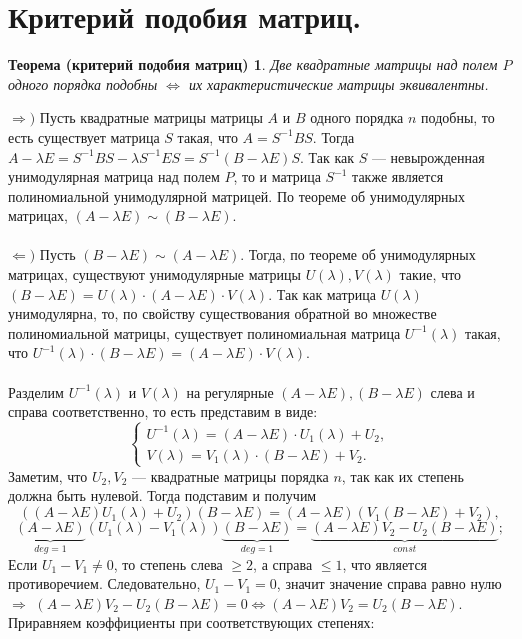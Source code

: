 \section{Критерий подобия матриц.}
\newtheorem*{th12_6}{Теорема (критерий подобия матриц)}\begin{th12_6}Две квадратные матрицы над полем $P$ одного порядка подобны
	$\Longleftrightarrow$ их характеристические матрицы эквивалентны.
\end{th12_6}\begin{Proof}
	$\Rightarrow)$ Пусть квадратные матрицы матрицы $A$ и $B$ одного порядка $n$ подобны, то есть существует матрица $S$ такая, что $A = S^{-1}BS$. Тогда $A-\lambda E = S^{-1} BS - \lambda S^{-1}ES = S^{-1}(B-\lambda E)S$. Так как $S$ --- невырожденная унимодулярная матрица над полем $P$, то и матрица $S^{-1}$ также является полиномиальной унимодулярной матрицей. По теореме об унимодулярных матрицах, $(A-\lambda E)\sim(B-\lambda E)$.\\\\
	$\Leftarrow)$ Пусть $(B-\lambda E)\sim(A-\lambda E)$. Тогда, по теореме об унимодулярных матрицах, существуют унимодулярные матрицы $U(\lambda), V(\lambda)$ такие, что $(B-\lambda E) = U(\lambda)\cdot (A-\lambda E)\cdot V(\lambda)$. Так как матрица $U(\lambda)$ унимодулярна, то, по свойству существования обратной во множестве полиномиальной матрицы, существует полиномиальная матрица $U^{-1}(\lambda)$ такая, что $U^{-1}(\lambda)\cdot(B-\lambda E) = (A-\lambda E)\cdot V(\lambda)$.\\\\
	Разделим $U^{-1}(\lambda)$ и $V(\lambda)$ на регулярные $(A-\lambda E), (B-\lambda E)$ слева и справа соответственно, то есть представим в виде:
	$$\begin{cases}
		U^{-1}(\lambda) = (A-\lambda E)\cdot U_1(\lambda) + U_2,\\
		V(\lambda) = V_1(\lambda)\cdot (B-\lambda E) +V_2.
	\end{cases}$$Заметим, что $U_2, V_2$ --- квадратные матрицы порядка $n$, так как их степень должна быть нулевой. Тогда подставим и получим
	$$((A-\lambda E)U_1(\lambda) + U_2)(B-\lambda E) = (A-\lambda E)(V_1(B-\lambda E) + V_2),$$
	$$\underbrace{(A-\lambda E)}_{deg=1}(U_1(\lambda) - V_1(\lambda))\underbrace{(B-\lambda E)}_{deg=1} = \underbrace{(A-\lambda E)V_2-U_2(B-\lambda E)}_{const};$$
	Если $U_1 - V_1 \ne 0$, то степень слева $\geqslant 2$, а справа $\leqslant 1$, что является противоречием. Следовательно, $U_1 - V_1 = 0$, значит значение справа равно нулю $\Rightarrow$ $(A-\lambda E)V_2 - U_2(B-\lambda E) = 0 \Leftrightarrow (A-\lambda E)V_2 = U_2(B-\lambda E)$. Приравняем коэффициенты при соответствующих степенях:\begin{center}

\end{center}
\end{Proof}
